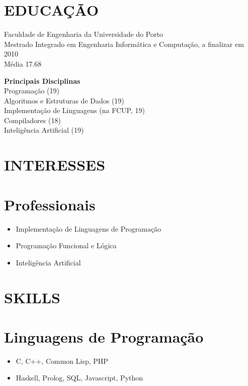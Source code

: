 \documentclass[margin]{res}
\begin{document}

\address{ Rua 1º de Maio, nº 48 \\   3515-560 Bodiosa \\   (+351) 934 908 448 \\ flaviocruz@gmail.com \\ \url{http://flaviocruz.net}}
                           
                        
\begin{resume}

\section{EDUCAÇÃO}       Faculdade de Engenharia da Universidade do Porto \\
                Mestrado Integrado em Engenharia Informática e Computação, a finalizar em 2010 \\
                Média 17.68
 
                \begin{ncolumn}{1}
                {\bf Principais Disciplinas} \\
                Programação (19)         \\
                Algoritmos e Estruturas de Dados (19)  \\
                Implementação de Linguagens (na FCUP, 19) \\
                Compiladores (18)      \\
                Inteligência Artificial (19)
		\end{ncolumn}

\section{INTERESSES}

\normalsize{\section{Professionais}} 
                 \begin{itemize}
                  \item Implementação de Linguagens de Programação
                  \item Programação Funcional e Lógica
                  \item Inteligência Artificial
                  \end{itemize}
\section{SKILLS} 
\normalsize{\section{Linguagens de Programação}}
                 \begin{itemize}
                 \item C, C++, Common Lisp, PHP
                 \item Haskell, Prolog, SQL, Javascript, Python
                 \end{itemize}
                 

\end{resume}
\end{document}
